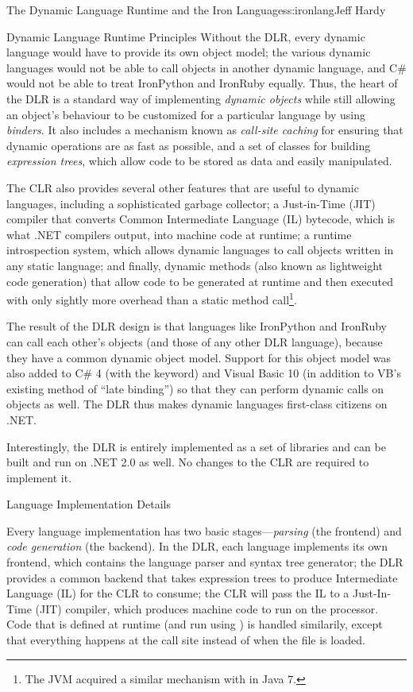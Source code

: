 \begin{aosachapter}{The Dynamic Language Runtime and the Iron Languages}{s:ironlang}{Jeff Hardy}
\begin{aosasect1}{Dynamic Language Runtime Principles}
Without the DLR, every dynamic language would have to provide its own object model; the various dynamic languages would not be able to call objects in another dynamic language, and C\# would not be able to treat IronPython and IronRuby equally. Thus, the heart of the DLR is a standard way of implementing \emph{dynamic objects} while still allowing an object's behaviour to be customized for a particular language by using \emph{binders}. It also includes a mechanism known as \emph{call-site caching} for ensuring that dynamic operations are as fast as possible, and a set of classes for building \emph{expression trees}, which allow code to be stored as data and easily manipulated.

The CLR also provides several other features that are useful to dynamic languages, including a sophisticated garbage collector; a Just-in-Time (JIT) compiler that converts Common Intermediate Language (IL) bytecode, which is what .NET compilers output, into machine code at runtime; a runtime introspection system, which allows dynamic languages to call objects written in any static language; and finally, dynamic methods (also known as lightweight code generation) that allow code to be generated at runtime and then executed with only sightly more overhead than a static method call\footnote{The JVM acquired a similar mechanism with  in Java 7.}.

The result of the DLR design is that languages like IronPython and IronRuby can call each other's objects (and those of any other DLR language), because they have a common dynamic object model. Support for this object model was also added to C\# 4 (with the  keyword) and Visual Basic 10 (in addition to VB's existing method of ``late binding'') so that they can perform dynamic calls on objects as well. The DLR thus makes dynamic languages first-class citizens on .NET.

Interestingly, the DLR is entirely implemented as a set of libraries and can be built and run on .NET 2.0 as well. No changes to the CLR are required to implement it.

\end{aosasect1}

\begin{aosasect1}{Language Implementation Details}

Every language implementation has two basic stages---\emph{parsing} (the frontend) and \emph{code generation} (the backend). In the DLR, each language implements its own frontend, which contains the language parser and syntax tree generator; the DLR provides a common backend that takes expression trees to produce Intermediate Language (IL) for the CLR to consume; the CLR will pass the IL to a Just-In-Time (JIT) compiler, which produces machine code to run on the processor. Code that is defined at runtime (and run using ) is handled similarily, except that everything happens at the  call site instead of when the file is loaded.


\end{aosasect1}
\end{aosachapter}
